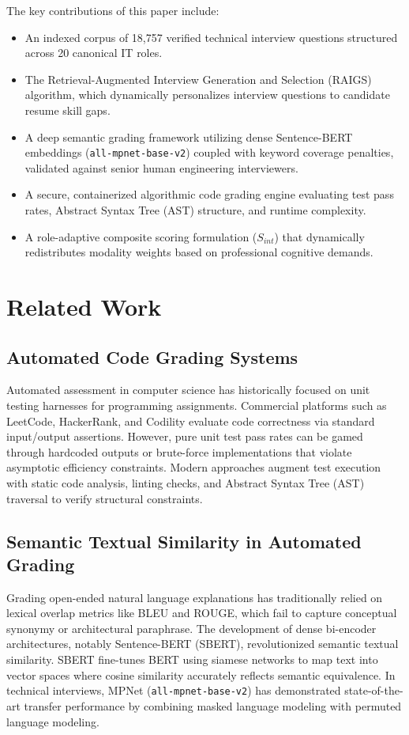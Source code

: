 \documentclass[conference]{IEEEtran}
\begin{document}
The key contributions of this paper include:
\begin{itemize}
    \item An indexed corpus of 18,757 verified technical interview questions structured across 20 canonical IT roles.
    \item The Retrieval-Augmented Interview Generation and Selection (RAIGS) algorithm, which dynamically personalizes interview questions to candidate resume skill gaps.
    \item A deep semantic grading framework utilizing dense Sentence-BERT embeddings (\texttt{all-mpnet-base-v2}) coupled with keyword coverage penalties, validated against senior human engineering interviewers.
    \item A secure, containerized algorithmic code grading engine evaluating test pass rates, Abstract Syntax Tree (AST) structure, and runtime complexity.
    \item A role-adaptive composite scoring formulation ($S_{int}$) that dynamically redistributes modality weights based on professional cognitive demands.
\end{itemize}

\section{Related Work}

\subsection{Automated Code Grading Systems}
Automated assessment in computer science has historically focused on unit testing harnesses for programming assignments. Commercial platforms such as LeetCode, HackerRank, and Codility evaluate code correctness via standard input/output assertions. However, pure unit test pass rates can be gamed through hardcoded outputs or brute-force implementations that violate asymptotic efficiency constraints. Modern approaches augment test execution with static code analysis, linting checks, and Abstract Syntax Tree (AST) traversal to verify structural constraints.

\subsection{Semantic Textual Similarity in Automated Grading}
Grading open-ended natural language explanations has traditionally relied on lexical overlap metrics like BLEU and ROUGE, which fail to capture conceptual synonymy or architectural paraphrase. The development of dense bi-encoder architectures, notably Sentence-BERT (SBERT), revolutionized semantic textual similarity. SBERT fine-tunes BERT using siamese networks to map text into vector spaces where cosine similarity accurately reflects semantic equivalence. In technical interviews, MPNet (\texttt{all-mpnet-base-v2}) has demonstrated state-of-the-art transfer performance by combining masked language modeling with permuted language modeling.
\end{document}
